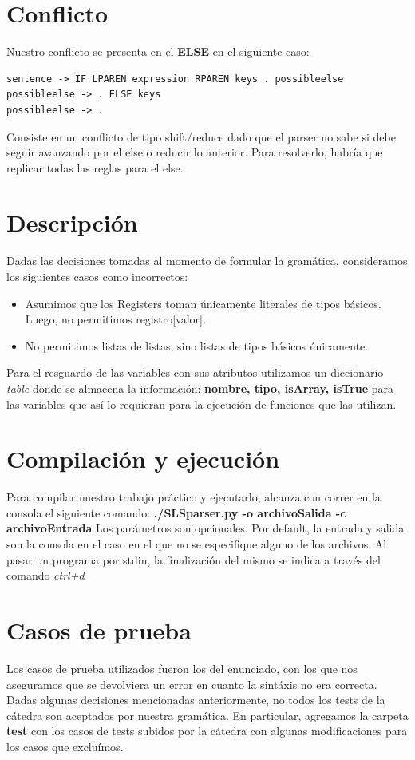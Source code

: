 \documentclass[10pt,a4paper]{article}
\begin{document}
\section{Conflicto}
Nuestro conflicto se presenta en el \textbf{ELSE} en el siguiente caso:

\begin{verbatim}
sentence -> IF LPAREN expression RPAREN keys . possibleelse
possibleelse -> . ELSE keys
possibleelse -> .
\end{verbatim}

Consiste en un conflicto de tipo shift/reduce dado que el parser no sabe si debe seguir avanzando por el else o reducir lo anterior. Para resolverlo, habría que replicar todas las reglas para el else.

\section{Descripción}

Dadas las decisiones tomadas al momento de formular la gramática, consideramos los siguientes casos como incorrectos:

\begin{itemize}
\item Asumimos que los Registers toman únicamente literales de tipos básicos. Luego, no permitimos registro[valor].
\item No permitimos listas de listas, sino listas de tipos básicos únicamente.
\end{itemize}

Para el resguardo de las variables con sus atributos utilizamos un diccionario \textit{table} donde se almacena la información: \textbf{nombre, tipo, isArray, isTrue} para las variables que así lo requieran para la ejecución de funciones que las utilizan.

\section{Compilación y ejecución}
Para compilar nuestro trabajo práctico y ejecutarlo, alcanza con correr en la consola el siguiente comando:
\textbf{./SLSparser.py -o archivoSalida -c archivoEntrada} 
Los parámetros son opcionales. Por default, la entrada y salida son la consola en el caso en el que no se especifique alguno de los archivos.
Al pasar un programa por stdin, la finalización del mismo se indica a través del comando \textit{ctrl+d}

\section{Casos de prueba}
Los casos de prueba utilizados fueron los del enunciado, con los que nos aseguramos que se devolviera un error en cuanto la sintáxis no era correcta. Dadas algunas decisiones mencionadas anteriormente, no todos los tests de la cátedra son aceptados por nuestra gramática. En particular, agregamos la carpeta \textbf{test} con los casos de tests subidos por la cátedra con algunas modificaciones para los casos que excluímos.
\end{document}
